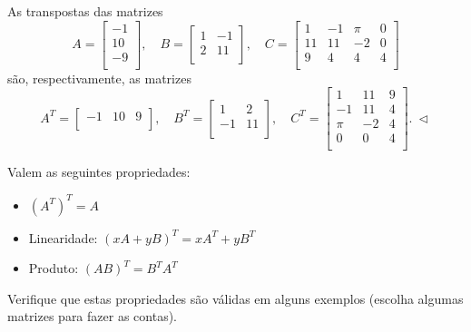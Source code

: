 \begin{ex}
	As transpostas das matrizes
	\begin{equation}
	A = \left[
	\begin{array}{c}
	-1  \\
	10  \\
	-9  \\
	\end{array}
	\right], \quad
	B = \left[
	\begin{array}{cc}
	1 & -1  \\
	2 & 11 \\
	\end{array}
	\right], \quad
	C = \left[
	\begin{array}{cccc}
	1  & -1 & \pi & 0 \\
	11 & 11 & -2  & 0 \\
	9  & 4  & 4   & 4 \\
	\end{array}
	\right]
	\end{equation} são, respectivamente, as matrizes
	\begin{equation}
	A^T = \left[
	\begin{array}{ccc}
	-1 & 10 & 9  \\
	\end{array}
	\right], \quad
	B^T = \left[
	\begin{array}{cc}
	1  & 2  \\
	-1 & 11 \\
	\end{array}
	\right], \quad
	C^T = \left[
	\begin{array}{ccc}
	1   & 11 & 9 \\
	-1  & 11 & 4 \\
	\pi & -2 & 4 \\
	0  & 0  & 4 \\
	\end{array}
	\right]. \ \lhd
	\end{equation}
\end{ex}


Valem as seguintes propriedades:
\begin{itemize}
	\item $(A^T)^T = A$
	\item Linearidade: $(xA + y B)^T = x A^T + y B^T$
	\item Produto: $(AB)^T = B^T A^T$
\end{itemize}

\begin{exer}
	Verifique que estas propriedades são válidas em alguns exemplos (escolha algumas matrizes para fazer as contas).
\end{exer}


